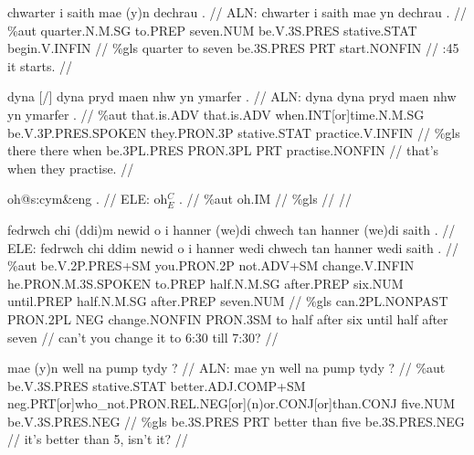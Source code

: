 \documentclass[a4paper,10pt]{article}
\begin{document}
\ex
\begingl[lingstyle=gergl]
\glchat chwarter i saith mae (y)n dechrau . //
\glsurface ALN:  chwarter i saith mae yn dechrau .  //
\glauto \%aut  quarter{\scriptsize .N.M.SG} to{\scriptsize .PREP} seven{\scriptsize .NUM} be{\scriptsize .V.3S.PRES} stative{\scriptsize .STAT} begin{\scriptsize .V.INFIN}   //
\glmanual \%gls  quarter to seven be{\scriptsize .3S.PRES} PRT start{\scriptsize .NONFIN}   //
:45 it starts. //
\endgl
\xe

\ex
\begingl[lingstyle=gergl]
\glchat dyna [/] dyna pryd maen nhw yn ymarfer . //
\glsurface ALN:  dyna dyna pryd maen nhw yn ymarfer .  //
\glauto \%aut  that{\scriptsize .is.ADV} that{\scriptsize .is.ADV} when{\scriptsize .INT[or]time.N.M.SG} be{\scriptsize .V.3P.PRES.SPOKEN} they{\scriptsize .PRON.3P} stative{\scriptsize .STAT} practice{\scriptsize .V.INFIN}   //
\glmanual \%gls  there there when be{\scriptsize .3PL.PRES} PRON{\scriptsize .3PL} PRT practise{\scriptsize .NONFIN}   //
\gleng that's when they practise. //
\endgl
\xe

\ex
\begingl[lingstyle=gergl]
\glchat oh@s:cym\&eng . //
\glsurface ELE:  oh$^{C}_{E}$ .  //
\glauto \%aut  oh{\scriptsize .IM}   //
\glmanual \%gls     //
\gleng  //
\endgl
\xe

\ex
\begingl[lingstyle=gergl]
\glchat fedrwch chi (ddi)m newid o i hanner (we)di chwech tan hanner (we)di saith . //
\glsurface ELE:  fedrwch chi ddim newid o i hanner wedi chwech tan hanner wedi saith .  //
\glauto \%aut  be{\scriptsize .V.2P.PRES+SM} you{\scriptsize .PRON.2P} not{\scriptsize .ADV+SM} change{\scriptsize .V.INFIN} he{\scriptsize .PRON.M.3S.SPOKEN} to{\scriptsize .PREP} half{\scriptsize .N.M.SG} after{\scriptsize .PREP} six{\scriptsize .NUM} until{\scriptsize .PREP} half{\scriptsize .N.M.SG} after{\scriptsize .PREP} seven{\scriptsize .NUM}   //
\glmanual \%gls  can{\scriptsize .2PL.NONPAST} PRON{\scriptsize .2PL} NEG change{\scriptsize .NONFIN} PRON{\scriptsize .3SM} to half after six until half after seven   //
\gleng can't you change it to 6:30 till 7:30? //
\endgl
\xe

\ex
\begingl[lingstyle=gergl]
\glchat mae (y)n well na pump tydy ? //
\glsurface ALN:  mae yn well na pump tydy ?  //
\glauto \%aut  be{\scriptsize .V.3S.PRES} stative{\scriptsize .STAT} better{\scriptsize .ADJ.COMP+SM} neg{\scriptsize .PRT[or]who\_not.PRON.REL.NEG[or](n)or.CONJ[or]than.CONJ} five{\scriptsize .NUM} be{\scriptsize .V.3S.PRES.NEG}   //
\glmanual \%gls  be{\scriptsize .3S.PRES} PRT better than five be{\scriptsize .3S.PRES.NEG}   //
\gleng it's better than 5, isn't it? //
\endgl
\xe
\end{document}
